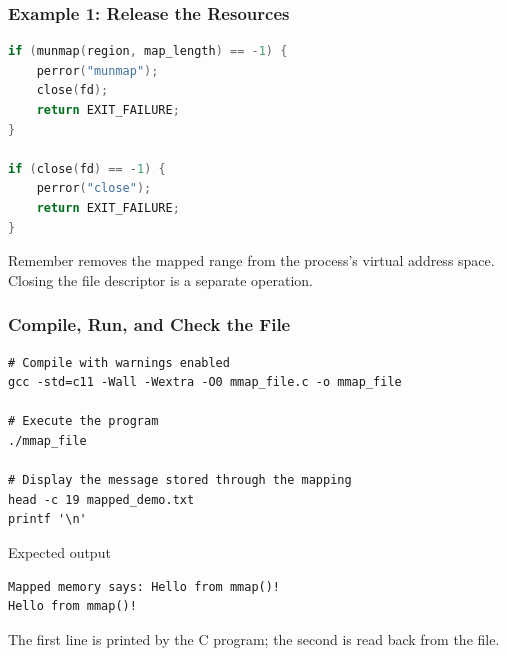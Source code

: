 \documentclass[10pt,hyperref={bookmarks=false},aspectratio=169,usenames,dvipsnames,hideothersubsections]{beamer}
\newcommand{\code}[1]{\texttt{\detokenize{#1}}}
\begin{document}
\begin{frame}[fragile]
\frametitle{Example 1: Release the Resources}
\begin{lstlisting}[language=C,basicstyle=\ttfamily\footnotesize]
if (munmap(region, map_length) == -1) {
    perror("munmap");
    close(fd);
    return EXIT_FAILURE;
}

if (close(fd) == -1) {
    perror("close");
    return EXIT_FAILURE;
}
\end{lstlisting}
\begin{block}{Remember}
\code{munmap()} removes the mapped range from the process's virtual address space. Closing the file descriptor is a separate operation.
\end{block}
\end{frame}

\begin{frame}[fragile]
\frametitle{Compile, Run, and Check the File}
\begin{lstlisting}[style=ShellStyle]
# Compile with warnings enabled
gcc -std=c11 -Wall -Wextra -O0 mmap_file.c -o mmap_file

# Execute the program
./mmap_file

# Display the message stored through the mapping
head -c 19 mapped_demo.txt
printf '\n'
\end{lstlisting}
\begin{block}{Expected output}
\begin{lstlisting}[style=ShellStyle]
Mapped memory says: Hello from mmap()!
Hello from mmap()!
\end{lstlisting}
The first line is printed by the C program; the second is read back from the file.
\end{block}
\end{frame}
\end{document}
